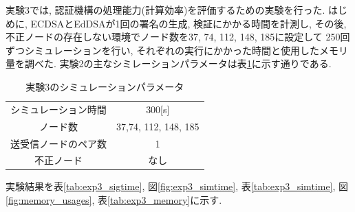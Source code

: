 \indent 実験3では, 認証機構の処理能力(計算効率)を評価するための実験を行った. 
はじめに, ECDSAとEdDSAが1回の署名の生成, 検証にかかる時間を計測し, 
その後, 不正ノードの存在しない環境でノード数を37, 74, 112, 148, 185に設定して
250回ずつシミュレーションを行い, それぞれの実行にかかった時間と使用したメモリ量を調べた. 
実験2の主なシミレーションパラメータは表\ref{tab:exp3-params}に示す通りである. 
\begin{longtable}{cc}
  \caption{実験3のシミュレーションパラメータ}
  \label{tab:exp3-params}
  \endfirsthead
  \hline
  シミュレーション時間 & 300[s] \\
  ノード数 & 37,74, 112, 148, 185 \\
  送受信ノードのペア数 & 1 \\ 
  不正ノード & なし \\ \hline
\end{longtable}
\vspace{1em}
\indent 実験結果を表\ref{tab:exp3_sigtime}, 図\ref{fig:exp3_simtime}, 
表\ref{tab:exp3_simtime}, 図\ref{fig:memory_usages}, 表\ref{tab:exp3_memory}に示す. \\

